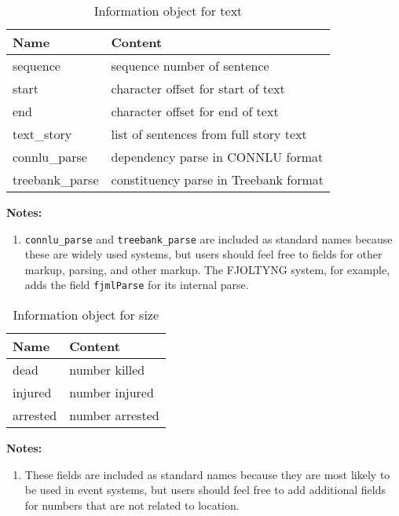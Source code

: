 \documentclass[11pt]{report}
\begin{document}
\begin{table}[htp]
\caption{Information object for text }
\begin{center}
\begin{tabular}{|l|l|}
\hline
Name & Content \\
\hline
sequence & sequence number of sentence \\
start & character offset for start of text  \\
end &  character offset for end of text   \\
text\_story & list of sentences from full story text \\
connlu\_parse & dependency parse in CONNLU format \\
treebank\_parse & constituency parse in Treebank format \\
\hline
\end{tabular}
\end{center}
\label{tab:textinfo}
\noindent \textbf{Notes:}
\begin{enumerate}
\item \texttt{connlu\_parse} and \texttt{treebank\_parse} are included as standard names because these are widely used systems, but users should feel free to fields for other markup, parsing, and other markup. The FJOLTYNG system, for example, adds the field \texttt{fjmlParse} for its internal parse.
\end{enumerate}
\end{table}%


\begin{table}[htp]
\caption{Information object for size }
\begin{center}
\begin{tabular}{|l|l|}
\hline
Name & Content \\
\hline
dead & number killed \\
injured & number injured \\
arrested & number arrested \\
\hline
\end{tabular}
\end{center}
\label{tab:sizeinfo}
\noindent \textbf{Notes:}
\begin{enumerate}
\item These fields are included as standard names because they are most likely to be used in event systems, but users should feel free to add additional fields for numbers that are not related to location.
\end{enumerate}
\end{table}%
\end{document}
